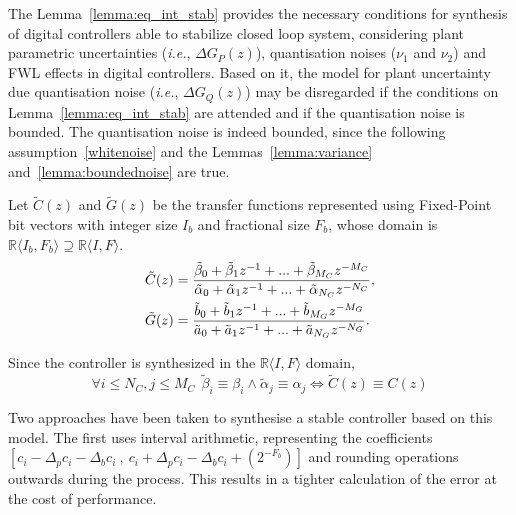 \documentclass{sig-alternate-05-2015}
\newcommand{\red}[1]{{\color{red}#1}}
\begin{document}
The Lemma~\ref{lemma:eq_int_stab} provides the necessary conditions for synthesis of digital controllers able to stabilize closed loop system, considering plant parametric uncertainties ({\it i.e.}, $\Delta G_{P}(z)$), quantisation noises ($\nu_{1}$ and $\nu_{2}$) and FWL effects in digital controllers. Based on it, the model for plant uncertainty due quantisation noise ({\it i.e.}, $\Delta G_{Q}(z)$) may be disregarded if the conditions on Lemma~\ref{lemma:eq_int_stab} are attended and if the quantisation noise is bounded.  The quantisation noise is indeed bounded, since the following assumption~\ref{whitenoise} and the Lemmas~\ref{lemma:variance} and~\ref{lemma:boundednoise} are true.


Let $\tilde C(z)$ and $\tilde G(z)$ be the transfer functions represented
using Fixed-Point bit vectors with integer size $I_b$ and fractional
size $F_b$, whose domain is $\mathbb{R}\langle I_b,F_b \rangle \supseteq \mathbb{R}\langle I,F \rangle$.
%
\begin{align}
\small
\label{digital_controller_plant_tf}
\tilde C(z)&=\frac{\tilde \beta_{0}+\tilde \beta_{1}z^{-1}+...+\tilde \beta_{M_C}z^{-M_C}}{\tilde \alpha_{0}+\tilde \alpha_{1}z^{-1}+...+\tilde \alpha_{N_C}z^{-N_C}}, \\
\tilde G(z)&=\frac{\tilde b_{0}+\tilde b_{1}z^{-1}+...+\tilde b_{M_G}z^{-M_G}}{\tilde a_{0}+\tilde a_{1}z^{-1}+...+\tilde a_{N_G}z^{-N_G}}.
\end{align}
 
Since the controller is synthesized in the $\mathbb{R}\langle I,F \rangle$
domain,
%
 $$\forall i \leq N_C, j \leq M_C\ \  \tilde \beta_{i} \equiv \beta_{i} \wedge \tilde \alpha_{j} \equiv \alpha_{j} \Leftrightarrow \tilde C(z) \equiv C(z)$$

Two approaches have been taken to synthesise a stable controller based on this model.
The first uses interval arithmetic, representing the coefficients $[{c}_i-\Delta_p{c}_i-\Delta_b{c}_i\ ,\ {c}_i+\Delta_p{c}_i-\Delta_b{c}_i+(2^{-F_b})]$  
and rounding operations outwards during the process. This results in a tighter calculation of the error at the cost of performance.


\end{document}

